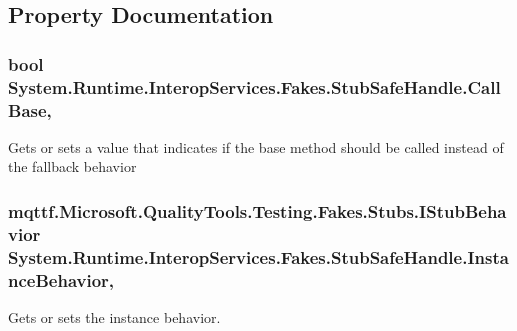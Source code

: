 \subsection{Property Documentation}
\hypertarget{class_system_1_1_runtime_1_1_interop_services_1_1_fakes_1_1_stub_safe_handle_ab9c760afce432a9204e025a71143f346}{
\subsubsection[{Call\-Base}]{\setlength{\rightskip}{0pt plus 5cm}bool System.\-Runtime.\-Interop\-Services.\-Fakes.\-Stub\-Safe\-Handle.\-Call\-Base\hspace{0.3cm}{\ttfamily [get]}, {\ttfamily [set]}}}\label{class_system_1_1_runtime_1_1_interop_services_1_1_fakes_1_1_stub_safe_handle_ab9c760afce432a9204e025a71143f346}


Gets or sets a value that indicates if the base method should be called instead of the fallback behavior

\hypertarget{class_system_1_1_runtime_1_1_interop_services_1_1_fakes_1_1_stub_safe_handle_ae74ef86be82a7089b81c2f38200d09a3}{
\subsubsection[{Instance\-Behavior}]{\setlength{\rightskip}{0pt plus 5cm}mqttf.\-Microsoft.\-Quality\-Tools.\-Testing.\-Fakes.\-Stubs.\-I\-Stub\-Behavior System.\-Runtime.\-Interop\-Services.\-Fakes.\-Stub\-Safe\-Handle.\-Instance\-Behavior\hspace{0.3cm}{\ttfamily [get]}, {\ttfamily [set]}}}\label{class_system_1_1_runtime_1_1_interop_services_1_1_fakes_1_1_stub_safe_handle_ae74ef86be82a7089b81c2f38200d09a3}


Gets or sets the instance behavior.

